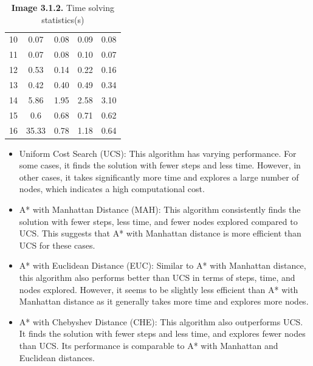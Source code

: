 \documentclass[english, a4paper,12pt]{article}
\begin{document}
\begin{table}[h]
\begin{minipage}{0.5\textwidth}
\begin{tabular}{|c|c|c|c|c|}
10 & 0.07 & 0.08 & 0.09 & 0.08\\
11 & 0.07 & 0.08 & 0.10 & 0.07\\
12 & 0.53 & 0.14 & 0.22 & 0.16\\
13 & 0.42 & 0.40 & 0.49 & 0.34\\
14 & 5.86 & 1.95 & 2.58 & 3.10 \\
15 & 0.6 & 0.68 & 0.71 & 0.62\\
16 & 35.33 & 0.78 & 1.18 & 0.64\\
\hline
\end{tabular}
\caption*{\textbf{Image 3.1.2.} Time solving statistics(s)}
\end{minipage}
\end{table}
\begin{itemize}
    \item Uniform Cost Search (UCS): This algorithm has varying performance. For some cases, it finds the solution with fewer steps and less time. However, in other cases, it takes significantly more time and explores a large number of nodes, which indicates a high computational cost.
    \item A* with Manhattan Distance (MAH): This algorithm consistently finds the solution with fewer steps, less time, and fewer nodes explored compared to UCS. This suggests that A* with Manhattan distance is more efficient than UCS for these cases.
    \item A* with Euclidean Distance (EUC): Similar to A* with Manhattan distance, this algorithm also performs better than UCS in terms of steps, time, and nodes explored. However, it seems to be slightly less efficient than A* with Manhattan distance as it generally takes more time and explores more nodes.
    \item A* with Chebyshev Distance (CHE): This algorithm also outperforms UCS. It finds the solution with fewer steps and less time, and explores fewer nodes than UCS. Its performance is comparable to A* with Manhattan and Euclidean distances.
\end{itemize}
\end{document}
